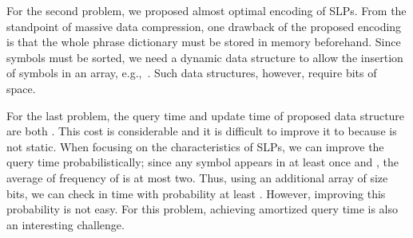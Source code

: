 \documentclass[10pt]{llncs}
\begin{document}
For the second problem, we proposed almost optimal encoding of SLPs.
From the standpoint of massive data compression,
one drawback of the proposed encoding is that
the whole phrase dictionary must be stored in memory beforehand.
Since symbols must be sorted, we need a dynamic data structure
to allow the insertion of symbols in an array, e.g.,~\cite{Jansson2012}.
Such data structures, however, require  bits of space.

For the last problem, the query time and update time of proposed 
data structure are both .
This cost is considerable and it is difficult to improve it
to  because  is not static.
When focusing on the characteristics of SLPs, 
we can improve the query time probabilistically;
since any symbol  appears in  at least once and ,
the average of frequency of  is at most two.
Thus, using an additional array of size  bits,
we can check  in  time with probability at least .
However, improving this probability is not easy.
For this problem, achieving  amortized query time is also an interesting challenge.






{\small

}
\end{document}
